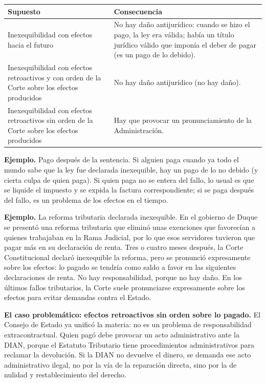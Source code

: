 \begin{tabla}
\begin{longtable}{|>{\raggedright\arraybackslash}m{}|>{\raggedright\arraybackslash}m{}|}
\hline
\cellcolor[HTML]{1F3864}\textcolor[HTML]{FFFFFF}{\textbf{Supuesto}} & \cellcolor[HTML]{1F3864}\textcolor[HTML]{FFFFFF}{\textbf{Consecuencia}} \\ \hline
Inexequibilidad con efectos hacia el futuro & No hay daño antijurídico: cuando se hizo el pago, la ley era válida; había un título jurídico válido que imponía el deber de pagar (es un pago de lo debido). \\ \hline
\cellcolor[HTML]{F2F5FA}Inexequibilidad con efectos retroactivos y con orden de la Corte sobre los efectos producidos & \cellcolor[HTML]{F2F5FA}No hay daño antijurídico (no hay daño). \\ \hline
Inexequibilidad con efectos retroactivos sin orden de la Corte sobre los efectos producidos & Hay que provocar un pronunciamiento de la Administración. \\ \hline
\end{longtable}
\end{tabla}
\begin{ejemplo}
\textcolor[HTML]{4F6228}{\textbf{Ejemplo. }}Pago después de la sentencia. Si alguien paga cuando ya todo el mundo sabe que la ley fue declarada inexequible, hay un pago de lo no debido (y cierta culpa de quien paga). Si quien paga no se entera del fallo, lo usual es que se liquide el impuesto y se expida la factura correspondiente; si se paga después del fallo, es un problema de los efectos en el tiempo.
\par
\textcolor[HTML]{4F6228}{\textbf{Ejemplo. }}La reforma tributaria declarada inexequible. En el gobierno de Duque se presentó una reforma tributaria que eliminó unas exenciones que favorecían a quienes trabajaban en la Rama Judicial, por lo que esos servidores tuvieron que pagar más en su declaración de renta. Tres o cuatro meses después, la Corte Constitucional declaró inexequible la reforma, pero se pronunció expresamente sobre los efectos: lo pagado se tendría como saldo a favor en las siguientes declaraciones de renta. No hay responsabilidad, porque no hay daño. En los últimos fallos tributarios, la Corte suele pronunciarse expresamente sobre los efectos para evitar demandas contra el Estado.
\end{ejemplo}
\textbf{El caso problemático: efectos retroactivos sin orden sobre lo pagado.} El Consejo de Estado ya unificó la materia: no es un problema de responsabilidad extracontractual. Quien pagó debe provocar un acto administrativo ante la DIAN, porque el Estatuto Tributario tiene procedimientos administrativos para reclamar la devolución. Si la DIAN no devuelve el dinero, se demanda ese acto administrativo ilegal, no por la vía de la reparación directa, sino por la de nulidad y restablecimiento del derecho.

